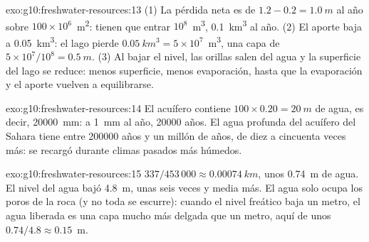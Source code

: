 \begin{solution}{exo:g10:freshwater-resources:13}
(1) La pérdida neta es de $1.2 - 0.2 = \qty{1.0}{m}$ al año sobre
$100 \times 10^6$~\unit{m^2}: tienen que entrar $10^8$~\unit{m^3},
\qty{0.1}{km^3} al año. (2) El aporte baja a \qty{0.05}{km^3}: el lago pierde
$\qty{0.05}{km^3} = 5 \times 10^7$~\unit{m^3}, una capa de
$5 \times 10^7/10^8 = \qty{0.5}{m}$. (3) Al bajar el nivel, las orillas
salen del agua y la superficie del lago se reduce: menos superficie, menos
evaporación, hasta que la evaporación y el aporte vuelven a equilibrarse.
\end{solution}

\begin{solution}{exo:g10:freshwater-resources:14}
El acuífero contiene $100 \times 0.20 = \qty{20}{m}$ de agua, es decir,
\qty{20000}{mm}: a \qty{1}{mm} al año, \num{20000} años. El agua profunda del
acuífero del Sahara tiene entre \num{200000} años y un millón de años, de diez
a cincuenta veces más: se recargó durante climas pasados más húmedos.
\end{solution}

\begin{solution}{exo:g10:freshwater-resources:15}
$337/453\,000 \approx \qty{0.00074}{km}$, unos \qty{0.74}{m} de agua. El
nivel del agua bajó \qty{4.8}{m}, unas seis veces y media más. El agua solo
ocupa los poros de la roca (y no toda se escurre): cuando el nivel freático
baja un metro, el agua liberada es una capa mucho más delgada que un metro,
aquí de unos $0.74/4.8 \approx \num{0.15}$~m.
\end{solution}


